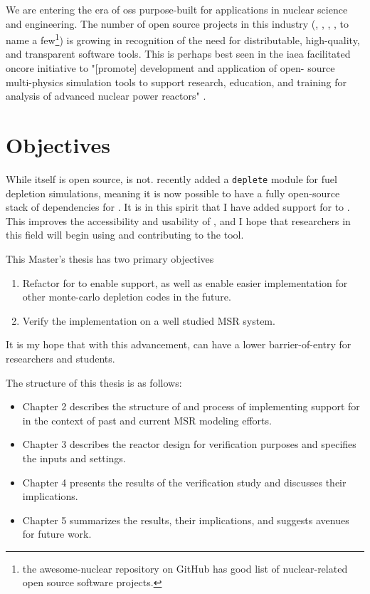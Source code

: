     We are entering the era of \Gls{oss} purpose-built for applications in nuclear science and engineering. The number of open source projects in this industry (\ONIX\cite{de_troullioud_de_lanversin_onix_2021}, \OpenMC, \NJOYTWOONE\cite{noauthor_njoy21_2022}, \Cyclus\cite{noauthor_cyclus_2022}, to name a few\footnote{the awesome-nuclear repository on GitHub \cite{romano_awesome_2022} has good list of nuclear-related open source software projects.}) is growing in recognition of the need for
    distributable, high-quality, and transparent software tools. This is perhaps best seen in the \Gls{iaea} facilitated \Gls{oncore} initiative \cite{fiorina_initiative_2021} to "[promote] development and application of open- source multi-physics simulation tools to support research, education, and training for analysis of advanced nuclear power reactors"  \cite{iaea_open-source_2022}. 


\section{Objectives}%
\label{sec:objectives}

While \SaltProc itself is open source, \SerpentTWO is not. \OpenMC recently added a \verb.deplete. module for fuel depletion simulations, meaning it is now possible to have a fully open-source stack of dependencies for \SaltProc.  It is in this spirit that I have added support for \OpenMC to \SaltProc. This improves the accessibility and usability of \SaltProc, and I hope that researchers in this field will begin using and contributing to the tool.

This Master's thesis has two primary objectives
\begin{enumerate}
    \item Refactor \SaltProc for to enable \OpenMC support, as well as enable easier implementation for other monte-carlo depletion codes in the future. 
    \item Verify the implementation on a well studied MSR system.
\end{enumerate}

It is my hope that with this advancement, \SaltProc can have a lower barrier-of-entry for researchers and students. 

The structure of this thesis is as follows:
\begin{itemize}
    \item Chapter 2 describes the structure of \SaltProc and process of implementing support for \OpenMC in the context of past and current \Gls{MSR} modeling efforts.
    \item Chapter 3 describes the reactor design for verification purposes and specifies the inputs and settings.
    \item Chapter 4 presents the results of the verification study and discusses their implications.
    \item Chapter 5 summarizes the results, their implications, and suggests avenues for future work.
\end{itemize}


